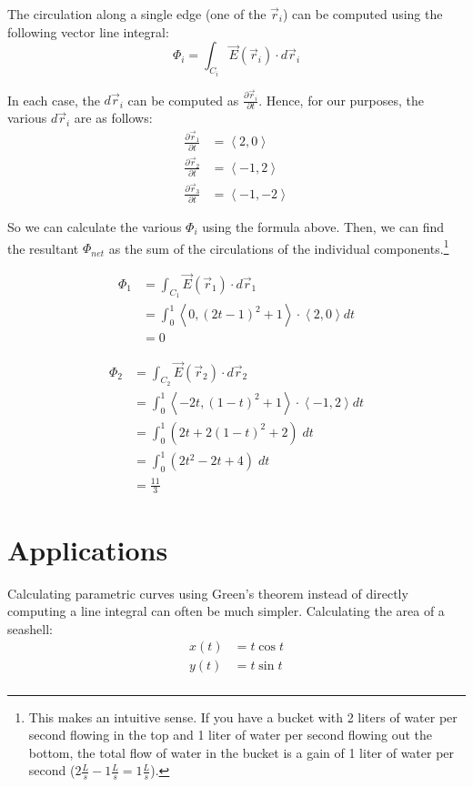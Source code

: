 \documentclass[11pt,English]{article}
\begin{document}
The circulation along a single edge (one of the $\vec{r}_i$) can be computed using the following vector line integral:
$$
\Phi_i = \int_{C_i} \vec{E}(\vec{r}_i) \cdot d\vec{r}_i
$$

In each case, the $d\vec{r}_i$ can be computed as $\frac{\partial\vec{r}_i}{\partial t}$. Hence, for our purposes, the various $d\vec{r}_i$ are as follows:
\begin{align}
    \frac{\partial\vec{r}_1}{\partial t} &= \left<2, 0\right> \\
    \frac{\partial\vec{r}_2}{\partial t} &= \left<-1, 2\right> \\
    \frac{\partial\vec{r}_3}{\partial t} &= \left<-1, -2\right>
\end{align}

So we can calculate the various $\Phi_i$ using the formula above. Then, we can find the resultant $\Phi_{net}$ as the sum of the circulations of the individual components.\footnote{This makes an intuitive sense. If you have a bucket with 2 liters of water per second flowing in the top and 1 liter of water per second flowing out the bottom, the total flow of water in the bucket is a gain of 1 liter of water per second ($2 \frac{L}{s} - 1 \frac{L}{s} = 1 \frac{L}{s}$).}

\begin{align*}
    \Phi_1 &= \int_{C_1} \vec{E}(\vec{r}_1) \cdot d\vec{r}_1 \\
    &= \int_0^1 \left<0, (2t-1)^2 +1\right> \cdot \left<2,0\right> dt \\
    &= 0
\end{align*}

\begin{align*}
    \Phi_2 &= \int_{C_2} \vec{E}(\vec{r}_2) \cdot d\vec{r}_2 \\
    &= \int_0^1 \left<-2t, (1-t)^2 +1\right> \cdot \left<-1,2\right> dt \\
    &= \int_0^1 (2t + 2(1-t)^2 +2) \; dt \\
    &= \int_0^1 (2t^2 -2t + 4) \; dt \\
    &= \frac{11}{3}
\end{align*}

\section{Applications}
Calculating parametric curves using Green's theorem instead of directly computing a line integral can often be much simpler. Calculating the area of a seashell:
\begin{align*}
    x(t) &= t\cos{t} \\
    y(t) &= t\sin{t} \\ 
\end{align*}
\end{document}
